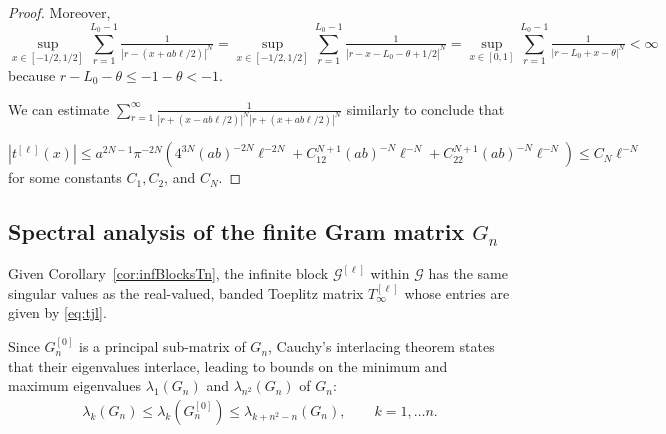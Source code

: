 \documentclass{article}
\newtheorem{remark}[theorem]{Remark}
\begin{document}
\begin{proof}
Moreover, $$\sup_{x\in [-1/2, 1/2]} \sum_{r=1}^{L_0-1} \tfrac{1}{ |r-(x+ab\ell/2)|^N}= \sup_{x\in [-1/2, 1/2]} \sum_{r=1}^{L_0-1} \tfrac{1}{ |r-x -L_0 -\theta +1/2|^N}= \sup_{x\in [0, 1]} \sum_{r=1}^{L_0-1} \tfrac{1}{ |r -L_0 +x -\theta |^N}<\infty $$ because $r-L_0-\theta \leq -1-\theta<-1$. 

We can estimate $\sum_{r=1}^{\infty} \tfrac{1}{|r+(x-ab\ell/2)|^N |r+(x+ab\ell/2)|^N} $ similarly to conclude that 




$$|t^{[\ell]}(x)| \leq a^{2N-1}\pi^{-2N} (4^{3N}(ab)^{-2N}\ell^{-2N} +C_12^{N+1}(ab)^{-N}\ell^{-N}+C_22^{N+1}(ab)^{-N}\ell^{-N})\leq C_N \ell^{-N}$$ for some constants $C_1, C_2$, and $C_N$. 
    
\end{proof}





















\subsection{Spectral analysis of the finite Gram matrix $G_n$}


Given Corollary~\ref{cor:infBlocksTn}, the infinite block $\mathscr{G}^{[\ell]}$  within $\mathscr{G}$  has the same singular values as the real-valued, banded Toeplitz matrix $T_{\infty}^{[\ell]}$ whose entries are given by \eqref{eq:tjl}. 


Since $G_n^{[0]}$ is a principal sub-matrix of $G_n$, Cauchy's interlacing theorem states that their eigenvalues interlace, leading to bounds  on the minimum and maximum eigenvalues $\lambda_1(G_n)$ and  $\lambda_{n^2}(G_n)$ of ${G}_n$: 
%
    \begin{align*}
        \lambda_k(G_n) \leq \lambda_k(G_n^{[0]}) \leq \lambda_{k+n^2-n}(G_n), \qquad k=1,\hdots n.
    \end{align*}
\end{document}

